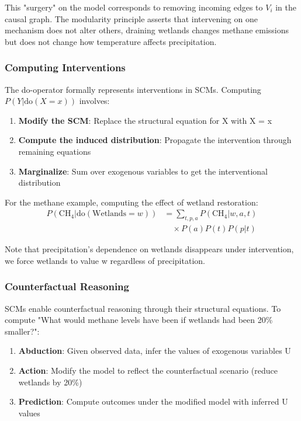This "surgery" on the model corresponds to removing incoming edges to $V_i$ in the causal graph. The modularity principle asserts that intervening on one mechanism does not alter others, draining wetlands changes methane emissions but does not change how temperature affects precipitation.

\subsubsection{Computing Interventions}

The do-operator formally represents interventions in SCMs. Computing $P(Y|\text{do}(X=x))$ involves:

\begin{enumerate}
\item \textbf{Modify the SCM}: Replace the structural equation for X with X = x
\item \textbf{Compute the induced distribution}: Propagate the intervention through remaining equations
\item \textbf{Marginalize}: Sum over exogenous variables to get the interventional distribution
\end{enumerate}

For the methane example, computing the effect of wetland restoration:
\begin{align}
P(\text{CH}_4|\text{do}(\text{Wetlands}=w)) &= \sum_{t,p,a} P(\text{CH}_4|w,a,t) \\
&\quad \times P(a)P(t)P(p|t)
\end{align}

Note that precipitation's dependence on wetlands disappears under intervention, we force wetlands to value w regardless of precipitation.

\subsubsection{Counterfactual Reasoning}

SCMs enable counterfactual reasoning through their structural equations. To compute "What would methane levels have been if wetlands had been 20\% smaller?":

\begin{enumerate}
\item \textbf{Abduction}: Given observed data, infer the values of exogenous variables U
\item \textbf{Action}: Modify the model to reflect the counterfactual scenario (reduce wetlands by 20\%)
\item \textbf{Prediction}: Compute outcomes under the modified model with inferred U values
\end{enumerate}

